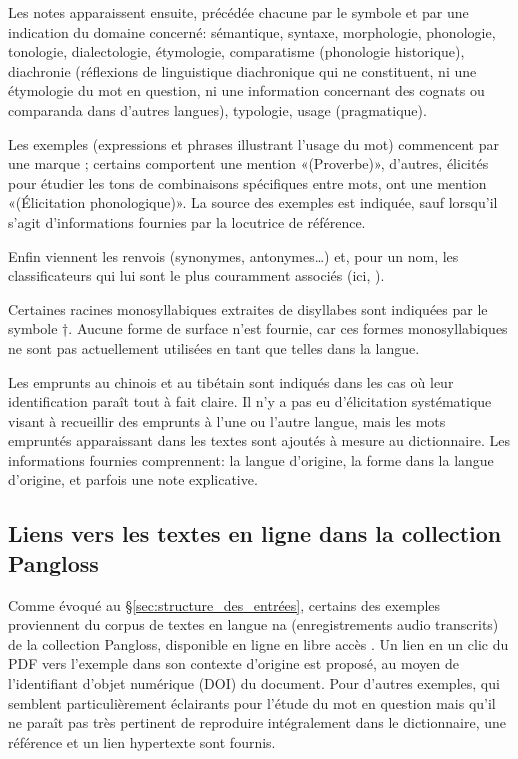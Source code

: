 Les notes apparaissent ensuite, précédée chacune par le symbole  et par une indication du domaine concerné: sémantique, syntaxe, morphologie, phonologie, tonologie, dialectologie, étymologie,  comparatisme (phonologie historique), diachronie (réflexions de linguistique diachronique qui ne constituent, ni une étymologie du mot en question, ni une information concernant des cognats ou comparanda dans d’autres langues), typologie, usage (pragmatique).

Les exemples (expressions et phrases illustrant l’usage du mot) commencent par une marque ; certains comportent une mention «(Proverbe)», d'autres, élicités pour étudier les tons de combinaisons spécifiques entre mots, ont une mention «(Élicitation phonologique)». La source des exemples est indiquée, sauf lorsqu'il s'agit d'informations fournies par la locutrice de référence.

Enfin viennent les renvois (synonymes, antonymes…) et, pour un nom, les classificateurs qui lui sont le plus couramment associés (ici, ).

Certaines racines monosyllabiques extraites de disyllabes sont indiquées par le symbole †. Aucune forme de surface n'est fournie, car ces formes monosyllabiques ne sont pas actuellement utilisées en tant que telles dans la langue.

Les emprunts au chinois et au tibétain sont indiqués dans les cas où leur identification paraît tout à fait claire. Il n'y a pas eu d'élicitation systématique visant à recueillir des emprunts à l'une ou l'autre langue, mais les mots empruntés apparaissant dans les textes sont ajoutés à mesure au dictionnaire. Les informations fournies comprennent: la langue d'origine, la forme dans la langue d'origine, et parfois une note explicative.

\subsection{Liens vers les textes en ligne dans la collection Pangloss}

Comme évoqué au §\ref{sec:structure_des_entrées}, certains des exemples proviennent du corpus de textes en langue na (enregistrements audio transcrits) de la collection Pangloss, disponible en ligne en libre accès \parencite[voir][]{michailovskyetal2014}. Un lien en un clic du PDF vers l'exemple dans son contexte d'origine est proposé, au moyen de l'identifiant d'objet numérique (DOI) du document. Pour d'autres exemples, qui semblent particulièrement éclairants pour l'étude du mot en question mais qu'il ne paraît pas très pertinent de reproduire intégralement dans le dictionnaire, une référence et un lien hypertexte sont fournis.

